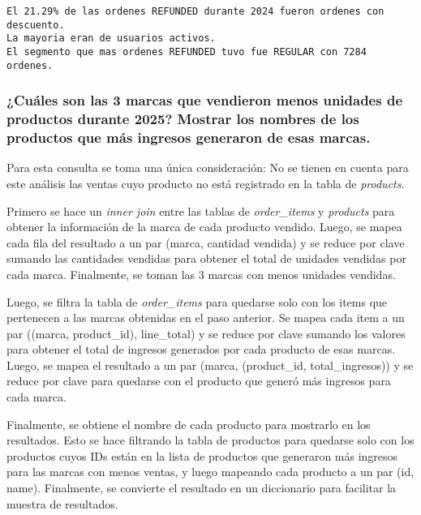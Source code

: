 \begin{lstlisting}[style=console, caption=Resultados de la consulta 2 propuesta propia, label={lst:propia_q2_results}, xleftmargin=30pt, xrightmargin=30pt]
El 21.29% de las ordenes REFUNDED durante 2024 fueron ordenes con descuento.
La mayoria eran de usuarios activos.
El segmento que mas ordenes REFUNDED tuvo fue REGULAR con 7284 ordenes.
\end{lstlisting}

\subsubsection{¿Cuáles son las 3 marcas que vendieron menos unidades de productos durante 2025? Mostrar los nombres de los productos que más ingresos generaron de esas marcas.}
Para esta consulta se toma una única consideración: No se tienen en cuenta para este análisis las ventas cuyo producto no está registrado en la tabla de \textit{products}.

Primero se hace un \textit{inner join} entre las tablas de \textit{order\_items} y \textit{products} para obtener la información de la marca de cada producto vendido. Luego, se mapea cada fila del resultado a un par (marca, cantidad vendida) y se reduce por clave sumando las cantidades vendidas para obtener el total de unidades vendidas por cada marca. Finalmente, se toman las 3 marcas con menos unidades vendidas.

Luego, se filtra la tabla de \textit{order\_items} para quedarse solo con los items que pertenecen a las marcas obtenidas en el paso anterior. Se mapea cada item a un par ((marca, product\_id), line\_total) y se reduce por clave sumando los valores para obtener el total de ingresos generados por cada producto de esas marcas. Luego, se mapea el resultado a un par (marca, (product\_id, total\_ingresos)) y se reduce por clave para quedarse con el producto que generó más ingresos para cada marca.

Finalmente, se obtiene el nombre de cada producto para mostrarlo en los resultados. Esto se hace filtrando la tabla de productos para quedarse solo con los productos cuyos IDs están en la lista de productos que generaron más ingresos para las marcas con menos ventas, y luego mapeando cada producto a un par (id, name). Finalmente, se convierte el resultado en un diccionario para facilitar la muestra de resultados.

